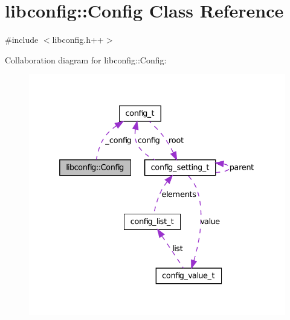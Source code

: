 \hypertarget{classlibconfig_1_1_config}{
\section{libconfig::Config Class Reference}
\label{classlibconfig_1_1_config}
}


{\ttfamily \#include $<$libconfig.h++$>$}



Collaboration diagram for libconfig::Config:
\nopagebreak
\begin{figure}[H]
\begin{center}
\leavevmode
\includegraphics[width=332pt]{classlibconfig_1_1_config__coll__graph}
\end{center}
\end{figure}
